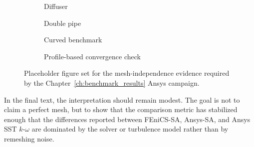 \begin{figure}[htpb]
	\centering
	\begin{subfigure}[b]{0.48\textwidth}
		\centering
		\caption{Diffuser}
		\label{fig:app_mesh_diffuser}
	\end{subfigure}
	\hfill
	\begin{subfigure}[b]{0.48\textwidth}
		\centering
		\caption{Double pipe}
		\label{fig:app_mesh_doublepipe}
	\end{subfigure}

	\vspace{0.5cm}

	\begin{subfigure}[b]{0.48\textwidth}
		\centering
		\caption{Curved benchmark}
		\label{fig:app_mesh_curved}
	\end{subfigure}
	\hfill
	\begin{subfigure}[b]{0.48\textwidth}
		\centering
		\caption{Profile-based convergence check}
		\label{fig:app_mesh_profiles}
	\end{subfigure}
	\caption{Placeholder figure set for the mesh-independence evidence required by the Chapter~\ref{ch:benchmark_results} Ansys campaign.}
	\label{fig:app_opt_mesh_study}
\end{figure}

In the final text, the interpretation should remain modest. The goal is not to claim a perfect mesh, but to show that the comparison metric has stabilized enough that the differences reported between FEniCS-SA, Ansys-SA, and Ansys SST $k$-$\omega$ are dominated by the solver or turbulence model rather than by remeshing noise.
